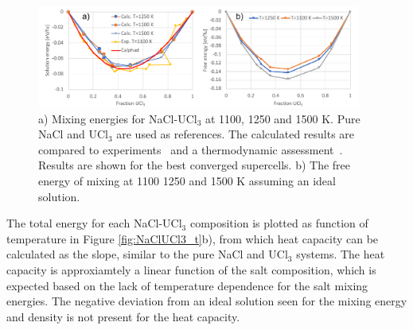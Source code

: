 \documentclass[preprint,3p,10pt,onecolumn,number,sort&compress]{elsarticle}
\begin{document}

\begin{figure}[htb]
\centering
\includegraphics[width=0.95\textwidth]{FIG7.pdf}
\caption{a) Mixing energies for NaCl-UCl$_3$ at 1100, 1250 and 1500 K. Pure NaCl and UCl$_3$ are used as references. The calculated results are compared to experiments~\cite{Matsuura} and a thermodynamic assessment~\cite{YIN2020}.%
 Results are shown for the best converged supercells. b) The free energy of mixing at 1100 1250 and 1500 K assuming an ideal solution.} 
\label{fig:NaClUCl3e}
\end{figure}

The total energy for each NaCl-UCl$_3$ composition is plotted as function of temperature in Figure \ref{fig:NaClUCl3_t}b), from which heat capacity can be calculated as the slope, similar to the pure NaCl and UCl$_3$ systems. The heat capacity is approxiamtely a linear function of the salt composition, which is expected based on the lack of temperature dependence for the salt mixing energies. The negative deviation from an ideal solution seen for the mixing energy and density is not present for the heat capacity. 
\end{document}
